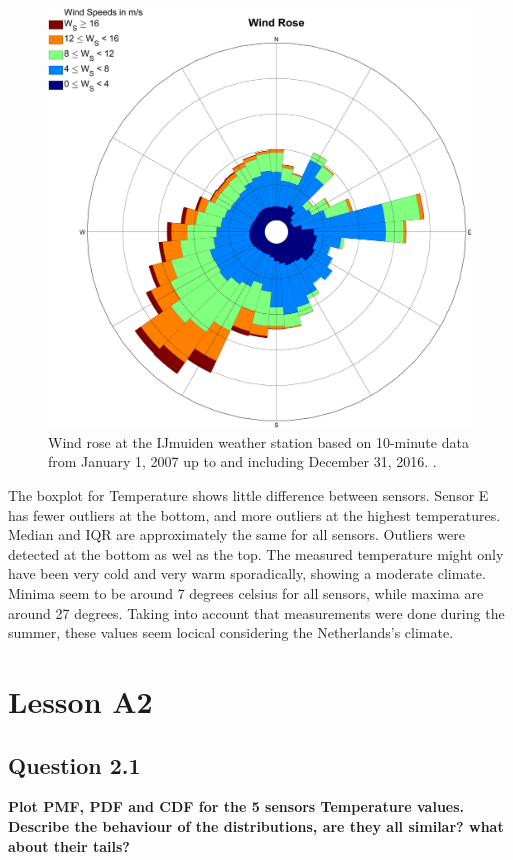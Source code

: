 \documentclass{report}
\begin{document}
	
	
	\begin{figure}[H]
		\centering
		\includegraphics[width=0.7\linewidth]{GEO1001_hw01_images/WindRose_IJmuiden.png}
		\caption{ Wind rose at the IJmuiden weather station based on 10-minute data from January 1, 2007 up to and including December 31, 2016. \cite{journalpone}.}
		\label{fig:winddirnl}
	\end{figure}
	
	\newpage %
	The boxplot for Temperature shows little difference between sensors. Sensor E has fewer outliers at the bottom, and more outliers at the highest temperatures. Median and IQR are approximately the same for all sensors. Outliers were detected at the bottom as wel as the top. The measured temperature might only have been very cold and very warm sporadically, showing a moderate climate. Minima seem to be around 7 degrees celsius for all sensors, while maxima are around 27 degrees. Taking into account that measurements were done during the summer, these values seem locical considering the Netherlands's climate.
	
	
	\section{Lesson A2}
	
	\subsection{Question 2.1}
	\textbf{Plot PMF, PDF and CDF for the 5 sensors Temperature values. Describe the behaviour of the distributions, are they all similar? what about their tails?}
	
\end{document}
